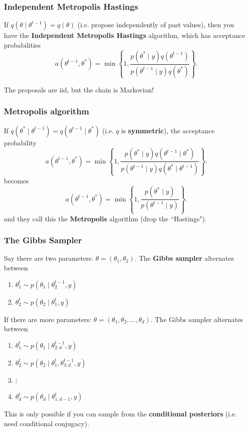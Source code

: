 \documentclass{beamer}
\begin{document}
\begin{frame}
\frametitle{Independent Metropolis Hastings}

If $q(\theta \mid \theta^{t-1}) = q(\theta)$ (i.e. propose independently of past values), then you have the {\bf Independent Metropolis Hastings} algorithm, which has acceptance probabilities
$$
a(\theta^{t-1}, \theta^*) = \min\left\{1, \frac{p(\theta^* \mid y)q(\theta^{t-1} ) }{p(\theta^{t-1} \mid y) q(\theta^* ) } \right\}.
$$

The proposals are iid, but the chain is Markovian!

\end{frame}

\begin{frame}
\frametitle{Metropolis algorithm}

If $q(\theta^* \mid \theta^{t-1}) = q(\theta^{t-1} \mid \theta^*)$ (i.e. $q$ is {\bf symmetric}), the acceptance probability
$$
a(\theta^{t-1}, \theta^*) = \min\left\{1, \frac{p(\theta^* \mid y)q(\theta^{t-1} \mid \theta^*) }{p(\theta^{t-1} \mid y) q(\theta^* \mid \theta^{t-1}) }\right\}.
$$
becomes
$$
a(\theta^{t-1}, \theta^*) = \min\left\{1, \frac{p(\theta^* \mid y)}{p(\theta^{t-1} \mid y)  }\right\}.
$$
and they call this the {\bf Metropolis} algorithm (drop the ``Hastings").

\end{frame}

\begin{frame}
\frametitle{The Gibbs Sampler}

Say there are two parameters: $\theta = (\theta_1, \theta_2)$. The {\bf Gibbs sampler} alternates between 
\begin{enumerate}
\item $\theta_1^t \sim p(\theta_1 \mid \theta_2^{t-1}, y)$
\item $\theta_2^t \sim p(\theta_2 \mid \theta_1^{t}, y)$
\end{enumerate}

If there are more parameters: $\theta = (\theta_1, \theta_2, \ldots, \theta_d)$. The Gibbs sampler alternates between 
\begin{enumerate}
\item $\theta_1^t \sim p(\theta_1 \mid \theta_{2:d}^{t-1}, y)$
\item $\theta_2^t \sim p(\theta_2 \mid \theta_1^t, \theta_{3:d}^{t-1}, y)$
\item $\vdots$
\item $\theta_d^t \sim p(\theta_d \mid \theta_{1:d-1}^{t}, y)$
\end{enumerate}

This is only possible if you can sample from the {\bf conditional posteriors} (i.e. need conditional conjugacy).

\end{frame}
\end{document}

